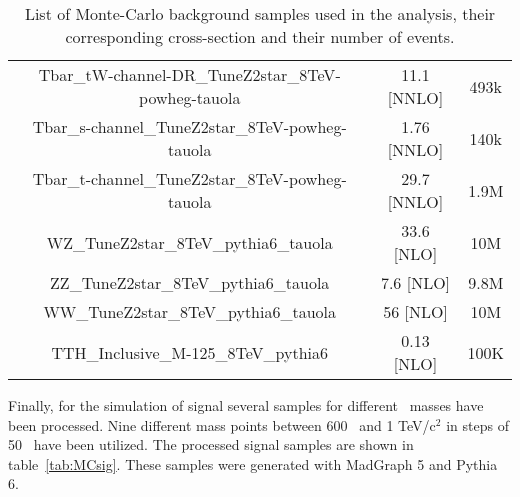 \begin{table*}[htbH]
\begin{center}
{\begin{tabular}{|c|c|c|}
Tbar\_tW-channel-DR\_TuneZ2star\_8TeV-powheg-tauola & 11.1 [NNLO] & 493k\\
Tbar\_s-channel\_TuneZ2star\_8TeV-powheg-tauola & 1.76 [NNLO] & 140k\\
Tbar\_t-channel\_TuneZ2star\_8TeV-powheg-tauola & 29.7 [NNLO] & 1.9M\\
WZ\_TuneZ2star\_8TeV\_pythia6\_tauola & 33.6 [NLO] & 10M\\
ZZ\_TuneZ2star\_8TeV\_pythia6\_tauola & 7.6 [NLO] & 9.8M\\
WW\_TuneZ2star\_8TeV\_pythia6\_tauola & 56 [NLO] & 10M\\
TTH\_Inclusive\_M-125\_8TeV\_pythia6 & 0.13 [NLO] & 100K\\
\hline
\end{tabular}
}
\caption{List of Monte-Carlo background samples used in the analysis, their corresponding cross-section and their number of events.\label{tab:MCbkg}}
\end{center}
\end{table*}

Finally, for the simulation of signal several samples for different \Tp~masses have been processed. Nine different mass points between 600 \GeVcc~and 1 TeV/$\text{c}^{2}$ in steps of 50 \GeVcc~have been utilized. The processed signal samples are shown in table~\ref{tab:MCsig}. These samples were generated with MadGraph 5 and Pythia 6.

\begin{table*}[htbH]
\begin{center}
\caption{List of Monte-Carlo signal samples used in the analysis, their corresponding cross-section and \Tp~mass.\label{tab:MCsig}}
\end{center}
\end{table*}


